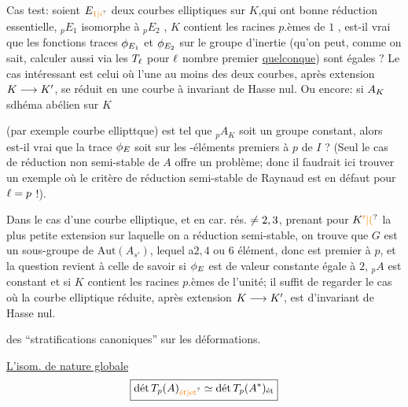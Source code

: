 Cas test: soient $E_{\unsure{1|i}}$ deux courbes elliptiques sur $K$,qui ont bonne réduction essentielle, $ {}_pE_1$ isomorphe à $ {}_pE_2$ , $K$ contient les racines $p$.èmes de $1$ , est-il vrai que les fonctions traces $\phi_{E_1}$ et $\phi_{E_2}$ sur le groupe d'inertie (qu'on peut, comme on sait, calculer aussi via les $T_{\ell}$ pour $\ell$ nombre premier \uline{quelconque}) sont égales  ? Le  cas intéressant est celui où l'une au moins des deux courbes, après extension $K\longrightarrow K'$, se réduit en une courbe à invariant de Hasse nul. Ou encore: si $A_{K}$ sdhéma abélien sur $K$

(par exemple courbe ellipttque) est tel que $ {}_p A_K$ soit un groupe constant, alors est-il vrai que la trace $\phi_E$ soit  sur les -éléments premiers à $p$ de $I$ ? (Seul le cas de réduction non semi-stable de $A$ offre un problème; donc il faudrait ici trouver un exemple où le critère de réduction semi-stable de Raynaud est en défaut pour $\ell=p$ !).

Dans le cas d'une courbe elliptique, et en car. rés. $\ne2,3$, prenant pour $K\handwritten{\unsure{'|(}}$ la plus petite extension sur laquelle on a réduction semi-stable, on trouve que $G$ est un sous-groupe de $\mathrm{Aut}(A_{s'})$, lequel  a\handwritten{(}$2,4$ ou $6$ élément, donc est premier à $p$, et la question revient à celle de savoir si $\phi_E$ est de valeur constante égale à $2$,  $ {}_p A$ est constant \handwritten{(}et si $K$ contient les racines $p$.èmes de l'unité; il suffit de regarder le cas où la courbe elliptique réduite, après extension $K\longrightarrow K'$, est d'invariant de Hasse nul\handwritten{)}\deleted{\unsure{;}}.



 des ``stratifications canoniques'' sur les déformations.

\uline{L'isom. de nature globale}
\[
\boxed{\operatorname{\text{dét}} T_p(A)_{\text{\unsure{ét|et}}}\simeq\operatorname{\text{dét}} T_p(A^{*})_{\text{ét}}}
\]

